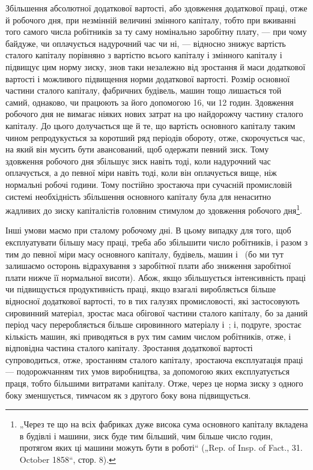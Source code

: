 Збільшення абсолютної додаткової вартості, або здовження
додаткової праці, отже й робочого дня, при незмінній величині
змінного капіталу, тобто при вживанні того самого числа робітників
за ту саму номінально заробітну плату, — при чому байдуже,
чи оплачується надурочний час чи ні, — відносно знижує
вартість сталого капіталу порівняно з вартістю всього капіталу
і змінного капіталу і підвищує цим норму зиску, знов таки
незалежно від зростання й маси додаткової вартості і можливого
підвищення норми додаткової вартості. Розмір основної
частини сталого капіталу, фабричних будівель, машин тощо лишається
той самий, однаково, чи працюють за його допомогою 16,
чи 12 годин. Здовження робочого дня не вимагає ніяких нових
затрат на цю найдорожчу частину сталого капіталу. До цього долучається
ще й те, що вартість основного капіталу таким чином репродукується
за коротший ряд періодів обороту, отже, скорочується
час, на який він мусить бути авансований, щоб одержати
певний зиск. Тому здовження робочого дня збільшує зиск навіть
тоді, коли надурочний час оплачується, а до певної міри навіть
тоді, коли він оплачується вище, ніж нормальні робочі години.
Тому постійно зростаюча при сучасній промисловій системі необхідність
збільшення основного капіталу була для ненаситно
жадливих до зиску капіталістів головним стимулом до здовження
робочого дня\footnote{
„Через те що на всіх фабриках дуже висока сума основного капіталу
вкладена в будівлі і машини, зиск буде тим більший, чим більше число годин,
протягом яких ці машини можуть бути в роботі“ („Rep. of Insp. of Fact., 31.
October 1858“, стор. 8).
}.

Інші умови маємо при сталому робочому дні. В цьому випадку
для того, щоб експлуатувати більшу масу праці, треба
або збільшити число робітників, і разом з тим до певної міри
масу основного капіталу, будівель, машин і~ (бо ми тут
залишаємо осторонь відрахування з заробітної плати або зниження
заробітної плати нижче її нормальної висоти). Абож, якщо
збільшується інтенсивність праці чи підвищується продуктивність
праці, якщо взагалі виробляється більше відносної додаткової
вартості, то в тих галузях промисловості, які застосовують
сировинний матеріал, зростає маса обігової частини
сталого капіталу, бо за даний період часу переробляється
більше сировинного матеріалу і~; і, подруге, зростає кількість
машин, які приводяться в рух тим самим числом робітників,
отже, і відповідна частина сталого капіталу. Зростання додаткової
вартості супроводиться, отже, зростанням сталого капіталу, зростаюча
експлуатація праці — подорожчанням тих умов виробництва,
за допомогою яких експлуатується праця, тобто більшими
витратами капіталу. Отже, через це норма зиску з одного
боку зменшується, тимчасом як з другого боку вона підвищується.


